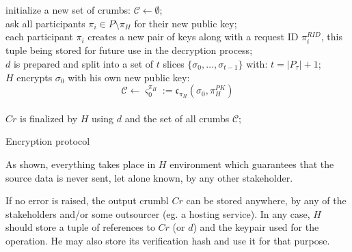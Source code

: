 \documentclass[twoside,twocolumn]{article}
\theoremstyle{definition}
\theoremstyle{remark}
\begin{document}
\begin{algorithm}
    initialize a new set of crumbs: $\mathcal{C} \gets \emptyset$; \\
    ask all participants $\pi_i \in P \setminus {\pi_H}$ for their new public key; \\
    each participant $\pi_i$ creates a new pair of keys along with a request ID $\pi_i^{RID}$, this tuple being stored for future use in the decryption 
        process; \\
    $d$ is prepared and split into a set of $t$ slices $\{ \sigma_0, \dots, \sigma_{t-1} \}$ with: $t = |P_\tau| + 1$; \\
    $H$ encrypts $\sigma_0$ with his own new public key: $$
        \mathcal{C} \gets \varsigma_0^{\pi_H} := \mathfrak{c}_{\pi_H}(\sigma_0, \pi_H^{PK})
    $$ \\
    $Cr$ is finalized by $H$ using $d$ and the set of all crumbs $\mathcal{C}$; \\
    \caption{Encryption protocol}
    \label{algo:encryption}
\end{algorithm}

As shown, everything takes place in $H$ environment which guarantees that the source data is never sent, let alone known, by any other stakeholder.

If no error is raised, the output crumbl $Cr$ can be stored anywhere, by any of the stakeholders and/or some outsourcer (eg. a hosting service). In any 
case, $H$ should store a tuple of references to $Cr$ (or $d$) and the keypair used for the operation. He may also store its verification hash and use 
it for that purpose.
\end{document}
